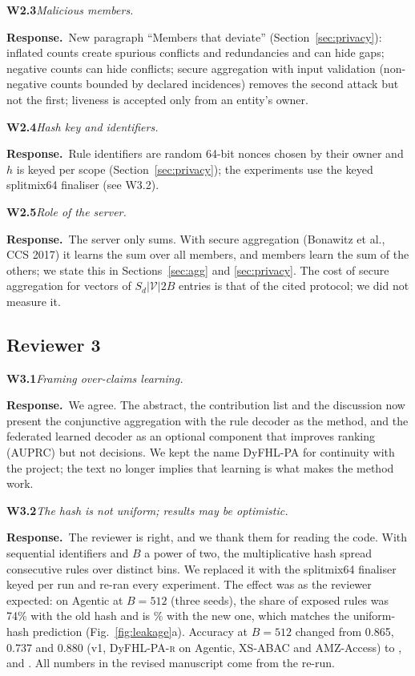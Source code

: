 \documentclass[11pt,a4paper]{article}
\newcommand{\name}{DyFHL-PA}
\newcommand{\R}{\textsc{r}}
\newcommand{\concern}[2]{\medskip\noindent\textbf{#1}\quad\emph{#2}\par\smallskip}
\newcommand{\resp}{\noindent\textcolor{blue!55!black}{\textbf{Response.}}\ }
\begin{document}
\concern{W2.3}{Malicious members.}
\resp New paragraph ``Members that deviate'' (Section~\ref{sec:privacy}): inflated counts create spurious conflicts and redundancies and can hide gaps; negative counts can hide conflicts; secure aggregation with input validation (non-negative counts bounded by declared incidences) removes the second attack but not the first; liveness is accepted only from an entity's owner.

\concern{W2.4}{Hash key and identifiers.}
\resp Rule identifiers are random 64-bit nonces chosen by their owner and $h$ is keyed per scope (Section~\ref{sec:privacy}); the experiments use the keyed splitmix64 finaliser (see W3.2).

\concern{W2.5}{Role of the server.}
\resp The server only sums. With secure aggregation (Bonawitz et al., CCS 2017) it learns the sum over all members, and members learn the sum of the others; we state this in Sections~\ref{sec:agg} and \ref{sec:privacy}. The cost of secure aggregation for vectors of $S_d|\mathcal V|2B$ entries is that of the cited protocol; we did not measure it.

\subsection*{Reviewer 3}
\concern{W3.1}{Framing over-claims learning.}
\resp We agree. The abstract, the contribution list and the discussion now present the conjunctive aggregation with the rule decoder as the method, and the federated learned decoder as an optional component that improves ranking (AUPRC) but not decisions. We kept the name \name{} for continuity with the project; the text no longer implies that learning is what makes the method work.

\concern{W3.2}{The hash is not uniform; results may be optimistic.}
\resp The reviewer is right, and we thank them for reading the code. With sequential identifiers and $B$ a power of two, the multiplicative hash spread consecutive rules over distinct bins. We replaced it with the splitmix64 finaliser keyed per run and re-ran every experiment. The effect was as the reviewer expected: on Agentic at $B=512$ (three seeds), the share of exposed rules was 74\% with the old hash and is \lkagenticBdxii\% with the new one, which matches the uniform-hash prediction (Fig.~\ref{fig:leakage}a). Accuracy at $B=512$ changed from 0.865, 0.737 and 0.880 (v1, \name-\R{} on Agentic, XS-ABAC and AMZ-Access) to \mainagenticR, \mainxustollerR{} and \mainamazonR. All numbers in the revised manuscript come from the re-run.
\end{document}
